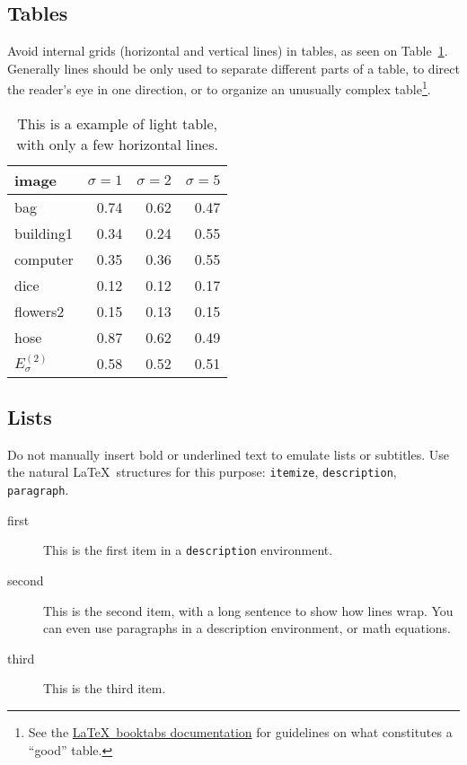 \documentclass{ipol}
\begin{document}
\subsection{Tables}

Avoid internal grids (horizontal and vertical lines) in
tables, as seen on Table~\ref{tbl:example}. Generally lines should be
only used to separate different parts of a table, to direct the
reader's eye in one direction, or to organize an unusually complex
table\footnote{See the 
  \href{http://mirrors.ctan.org/macros/latex/contrib/booktabs/booktabs.pdf}{\LaTeX\ booktabs
    documentation} for guidelines on what constitutes a ``good''
  table.}.

\begin{table}[!htbp]
\begin{center}
\begin{tabular}{l r r r}
\hline
image & $\sigma=1$ & $\sigma=2$ & $\sigma=5$ \\
\hline
bag & 0.74 & 0.62 & 0.47 \\
building1 & 0.34 & 0.24 & 0.55 \\
computer & 0.35 & 0.36 & 0.55 \\
dice & 0.12 & 0.12 & 0.17 \\
flowers2 & 0.15 & 0.13 & 0.15 \\
hose & 0.87 & 0.62 & 0.49 \\
\hline
$E^{(2)}_\sigma$ & 0.58 & 0.52 & 0.51 \\
\hline
\end{tabular}
\caption{This is a example of light table, with only a few horizontal lines.}
\label{tbl:example}
\end{center}
\end{table}

\subsection{Lists}

Do not manually insert bold or underlined text to emulate lists or
subtitles. Use the natural \LaTeX\ structures for this purpose:
\verb|itemize|, \verb|description|, \verb|paragraph|.

\begin{description}
\item[first] This is the first item in a \verb|description|
  environment.
\item[second] This is the second item, with a long sentence to show
  how lines wrap. You can even use paragraphs in a description
  environment, or math equations.
\item[third] This is the third item.
\end{description}
\end{document}
